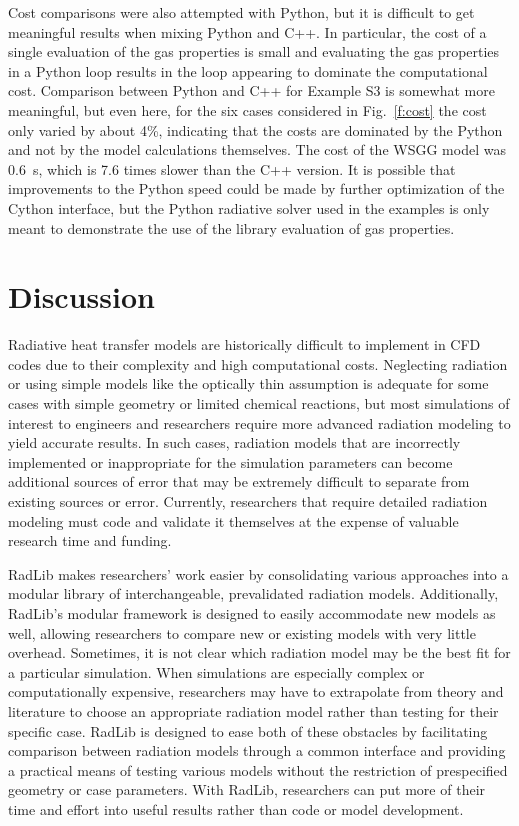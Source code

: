 \documentclass[preprint,12pt]{elsarticle}
\begin{document}
Cost comparisons were also attempted with Python, but it is difficult to get meaningful results when mixing Python and C++. In particular, the cost of a single evaluation of the gas properties is small and evaluating the gas properties in a Python loop results in the loop appearing to dominate the computational cost. Comparison between Python and C++ for Example S3 is somewhat more meaningful, but even here, for the six cases considered in Fig.~\ref{f:cost} the cost only varied by about 4\%, indicating that the costs are dominated by the Python and not by the model calculations themselves. The cost of the WSGG model was 0.6~s, which is 7.6 times slower than the C++ version. It is possible that improvements to the Python speed could be made by further optimization of the Cython interface, but the Python radiative solver used in the examples is only meant to demonstrate the use of the library evaluation of gas properties.


\section{Discussion} \label{s:impact}

Radiative heat transfer models are historically difficult to implement in CFD codes due to their complexity and high computational costs. Neglecting radiation or using simple models like the optically thin assumption is adequate for some cases with simple geometry or limited chemical reactions, but most simulations of interest to engineers and researchers require more advanced radiation modeling to yield accurate results. In such cases, radiation models that are incorrectly implemented or inappropriate for the simulation parameters can become additional sources of error that may be extremely difficult to separate from existing sources or error. Currently, researchers that require detailed radiation modeling must code and validate it themselves at the expense of valuable research time and funding. 

RadLib makes researchers' work easier by consolidating various approaches into a modular library of interchangeable, prevalidated radiation models. Additionally, RadLib's modular framework is designed to easily accommodate new models as well, allowing researchers to compare new or existing models with very little overhead. Sometimes, it is not clear which radiation model may be the best fit for a particular simulation. When simulations are especially complex or computationally expensive, researchers may have to extrapolate from theory and literature to choose an appropriate radiation model rather than testing for their specific case. RadLib is designed to ease both of these obstacles by facilitating comparison between radiation models through a common interface and providing a practical means of testing various models without the restriction of prespecified geometry or case parameters. With RadLib, researchers can put more of their time and effort into useful results rather than code or model development. 
\end{document}

